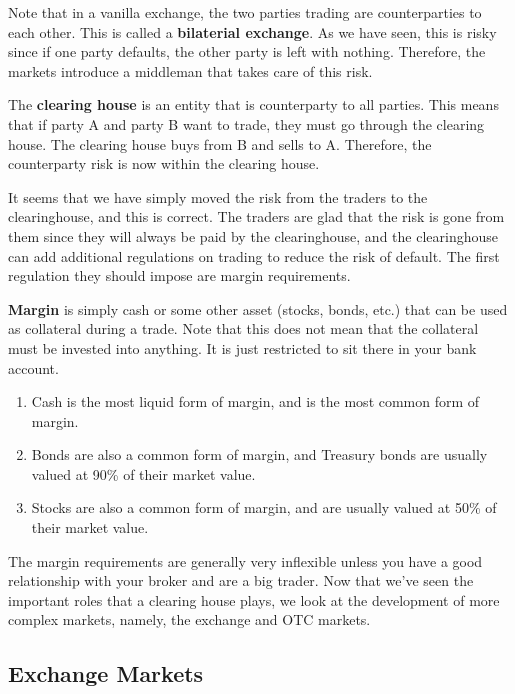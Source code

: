 \documentclass{article}
\begin{document}
    Note that in a vanilla exchange, the two parties trading are counterparties to each other. This is called a \textbf{bilaterial exchange}. As we have seen, this is risky since if one party defaults, the other party is left with nothing. Therefore, the markets introduce a middleman that takes care of this risk. 

    \begin{definition}
      The \textbf{clearing house} is an entity that is counterparty to all parties. This means that if party A and party B want to trade, they must go through the clearing house. The clearing house buys from B and sells to A. Therefore, the counterparty risk is now within the clearing house.
    \end{definition}

    It seems that we have simply moved the risk from the traders to the clearinghouse, and this is correct. The traders are glad that the risk is gone from them since they will always be paid by the clearinghouse, and the clearinghouse can add additional regulations on trading to reduce the risk of default. The first regulation they should impose are margin requirements. 

    \begin{definition}[Margin]
      \textbf{Margin} is simply cash or some other asset (stocks, bonds, etc.) that can be used as collateral during a trade. Note that this does not mean that the collateral must be invested into anything. It is just restricted to sit there in your bank account. 
      \begin{enumerate}
        \item Cash is the most liquid form of margin, and is the most common form of margin. 
        \item Bonds are also a common form of margin, and Treasury bonds are usually valued at 90\% of their market value.
        \item Stocks are also a common form of margin, and are usually valued at 50\% of their market value. 
      \end{enumerate}
    \end{definition}

    The margin requirements are generally very inflexible unless you have a good relationship with your broker and are a big trader. Now that we've seen the important roles that a clearing house plays, we look at the development of more complex markets, namely, the exchange and OTC markets. 

  \subsection{Exchange Markets}
\end{document}
